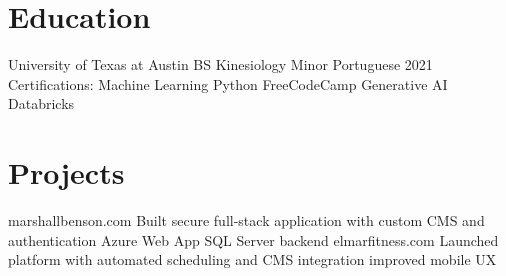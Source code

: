 \documentclass[11pt]{article}
\begin{document}
\section{Education}
University of Texas at Austin BS Kinesiology Minor Portuguese 2021
Certifications: Machine Learning Python FreeCodeCamp Generative AI Databricks

\section{Projects}
marshallbenson.com Built secure full-stack application with custom CMS and authentication Azure Web App SQL Server backend
elmarfitness.com Launched platform with automated scheduling and CMS integration improved mobile UX
\end{document}
